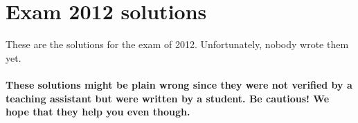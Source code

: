\documentclass[main]{subfiles}
\begin{document}

\section{Exam 2012 solutions}
These are the solutions for the exam of 2012. Unfortunately, nobody wrote them yet.\\\\
\textbf{These solutions might be plain wrong since they were not verified by a teaching assistant but were written by a student. Be cautious! We hope that they help you even though.}

\end{document}
